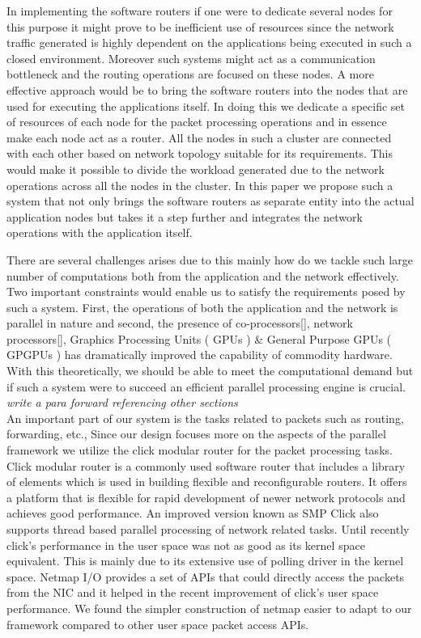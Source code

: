 \documentclass[conference]{IEEEtran}
\begin{document}
In implementing the software routers if one were to dedicate several nodes for this purpose it might prove to be inefficient use of resources since the network traffic generated is highly dependent on the applications being executed in such a closed environment. Moreover such systems might act as a communication bottleneck and the routing operations are focused on these nodes. A more effective approach would be to bring the software routers into the nodes that are used for executing the applications itself. In doing this we dedicate a specific set of resources of each node for the packet processing operations and in essence make each node act as a router. All the nodes in such a cluster are connected with each other based on network topology suitable for its requirements. This would make it possible to divide the workload generated due to the network operations across all the nodes in the cluster. In this paper we propose such a system that not only brings the software routers as separate entity into the actual application nodes but takes it a step further and integrates the network operations with the application itself. 

There are several challenges arises due to this mainly how do we tackle such large number of computations both from the application and the network effectively. Two important constraints would enable us to satisfy the requirements posed by such a system. First, the operations of both the application and the network is parallel in nature and second, the presence of co-processors[], network processors[], Graphics Processing Units ( GPUs ) \& General Purpose GPUs ( GPGPUs ) has dramatically improved the capability of commodity hardware. With this theoretically, we should be able to meet the computational demand but if such a system were to succeed an efficient parallel processing engine is crucial.\\

\textit{write a para forward referencing other sections}\\

An important part of our system is the tasks related to packets such as routing, forwarding, etc., Since our design focuses more on the aspects of the parallel framework we utilize the click modular router for the packet processing tasks. Click modular router \cite{click} is a commonly used software router that includes a library of elements which is used in building flexible and reconfigurable routers. It offers a platform that is flexible for rapid development of newer network protocols and achieves good performance. An improved version known as SMP Click \cite{smpclick} also supports thread based parallel processing of network related tasks. Until recently click's performance in the user space was not as good as its kernel space equivalent. This is mainly due to its extensive use of polling driver in the kernel space. Netmap I/O \cite{netmap} provides a set of APIs that could directly access the packets from the NIC and it helped in the recent improvement of click's user space performance. We found the simpler construction of netmap easier to adapt to our framework  compared to other user space packet access APIs.   
\end{document}
